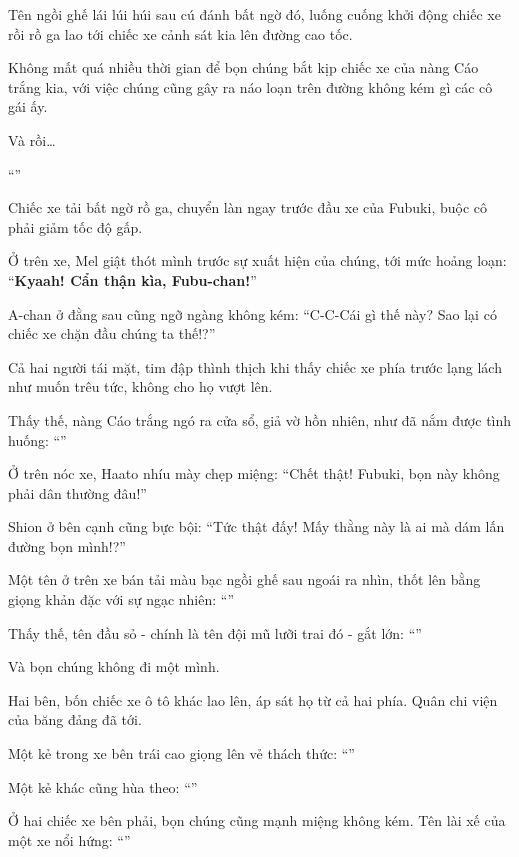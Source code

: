 \documentclass[../main.tex]{subfiles}
\begin{document}
Tên ngồi ghế lái lúi húi sau cú đánh bất ngờ đó, luống cuống khởi động chiếc xe rồi rồ ga lao tới chiếc xe cảnh sát kia lên đường cao tốc.

Không mất quá nhiều thời gian để bọn chúng bắt kịp chiếc xe của nàng Cáo trắng kia, với việc chúng cũng gây ra náo loạn trên đường không kém gì các cô gái ấy.

Và rồi\dots

``\textbf{}''

Chiếc xe tải bất ngờ rồ ga, chuyển làn ngay trước đầu xe của Fubuki, buộc cô phải giảm tốc độ gấp.

Ở trên xe, Mel giật thót mình trước sự xuất hiện của chúng, tới mức hoảng loạn: ``\textbf{Kyaah! Cẩn thận kìa, Fubu-chan!}''

A-chan ở đằng sau cũng ngỡ ngàng không kém: ``C-C-Cái gì thế này? Sao lại có chiếc xe chặn đầu chúng ta thế!?''

Cả hai người tái mặt, tim đập thình thịch khi thấy chiếc xe phía trước lạng lách như muốn trêu tức, không cho họ vượt lên.

Thấy thế, nàng Cáo trắng ngó ra cửa sổ, giả vờ hồn nhiên, như đã nắm được tình huống: ``''

Ở trên nóc xe, Haato nhíu mày chẹp miệng: ``Chết thật! Fubuki, bọn này không phải dân thường đâu!''

Shion ở bên cạnh cũng bực bội: ``Tức thật đấy! Mấy thằng này là ai mà dám lấn đường bọn mình!?''

Một tên ở trên xe bán tải màu bạc ngồi ghế sau ngoái ra nhìn, thốt lên bằng giọng khản đặc với sự ngạc nhiên: ``''

Thấy thế, tên đầu sỏ - chính là tên đội mũ lưỡi trai đó - gắt lớn: ``''

Và bọn chúng không đi một mình.

Hai bên, bốn chiếc xe ô tô khác lao lên, áp sát họ từ cả hai phía. Quân chi viện của băng đảng đã tới.

Một kẻ trong xe bên trái cao giọng lên vẻ thách thức: ``''

Một kẻ khác cũng hùa theo: ``''

Ở hai chiếc xe bên phải, bọn chúng cũng mạnh miệng không kém. Tên lài xế của một xe nổi hứng: ``''
\end{document}
